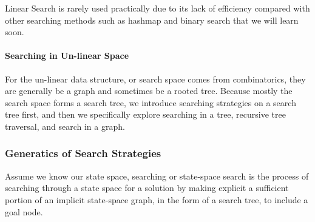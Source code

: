 \documentclass[main.tex]{subfiles}
\begin{document}
Linear Search is rarely used practically due to its lack of efficiency compared with other searching methods such as hashmap and binary search that we will learn soon.
\paragraph{Searching in Un-linear Space}
For the un-linear data structure, or search space comes from combinatorics, they are generally be a graph and sometimes be a rooted tree. Because mostly the search space forms a search tree, we introduce searching strategies on a search tree first, and then we specifically explore searching in a tree, recursive tree traversal, and search in a graph. 

\subsubsection{Generatics of Search Strategies}
Assume we know our state space, searching or state-space search is the process of searching through a state space for a solution by making explicit a sufficient portion of an implicit state-space graph, in the form of a search tree, to include a goal node. 
\end{document}
